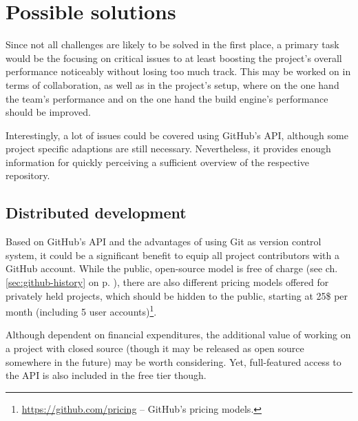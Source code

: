 \section{Possible solutions}
\label{sec:possible-solutions}

Since not all challenges are likely to be solved in the first place, a primary task would be the focusing on critical issues to at least boosting the project's overall performance noticeably without losing too much track. This may be worked on in terms of collaboration, as well as in the project's setup, where on the one hand the team's performance and on the one hand the build engine's performance should be improved.

Interestingly, a lot of issues could be covered using GitHub's API, although some project specific adaptions are still necessary. Nevertheless, it provides enough information for quickly perceiving a sufficient overview of the respective repository.

\subsection{Distributed development}
\label{sec:solutions-distributeddevelopment}

Based on GitHub's API and the advantages of using Git as version control system, it could be a significant benefit to equip all project contributors with a GitHub account. While the public, open-source model is free of charge (see ch. \ref{sec:github-history} on p. \pageref{sec:github-history}), there are also different pricing models offered for privately held projects, which should be hidden to the public, starting at 25\$ per month (including 5 user accounts)\footnote{\url{https://github.com/pricing} -- GitHub's pricing models.}.

Although dependent on financial expenditures, the additional value of working on a project with closed source (though it may be released as open source somewhere in the future) may be worth considering. Yet, full-featured access to the API is also included in the free tier though.
